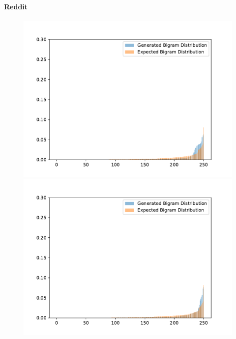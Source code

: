 \paragraph{Reddit} \blindtext
\begin{figure}[H]
	\includegraphics[width=\linewidth]{img/plots/reddit/bigram_distribution_comparison_step_500000.pdf}
	\centering
	\small
	\endminipage\hfill
	\includegraphics[width=\linewidth]{img/plots/reddit/bigram_distribution_comparison_step_1000000.pdf}
	\centering
	\small
	\endminipage\hfill

\end{figure}
